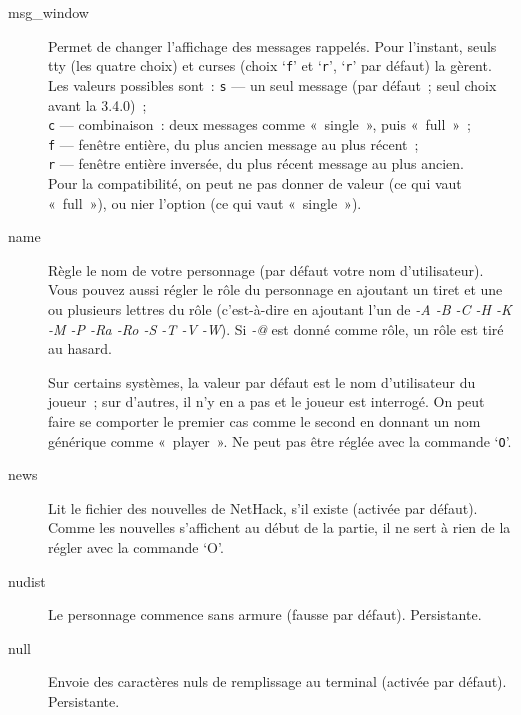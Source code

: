 \documentclass[titlepage]{article}
\begin{document}
\begin{description}
\item[{msg\_window}]
Permet de changer l'affichage des messages rappelés.
Pour l'instant, seuls tty (les quatre choix) et curses (choix
`\texttt{f}' et `\texttt{r}', `\texttt{r}' par défaut) la
gèrent.
Les valeurs possibles sont~:
\texttt{s} --- un seul message (par défaut~; seul choix avant la 3.4.0)~;\\
\texttt{c} --- combinaison~: deux messages comme «~single~», puis «~full~»~;\\
\texttt{f} --- fenêtre entière, du plus ancien message au plus récent~;\\
\texttt{r} --- fenêtre entière inversée, du plus récent message au plus ancien.\\
Pour la compatibilité, on peut ne pas donner de valeur (ce qui vaut
«~full~»), ou nier l'option (ce qui vaut «~single~»).

\item[{name}]
Règle le nom de votre personnage (par défaut votre nom d'utilisateur).
Vous pouvez aussi régler le rôle du personnage en ajoutant un tiret et une
ou plusieurs lettres du rôle (c'est-à-dire en ajoutant l'un de
\textit{-A -B -C -H -K -M -P -Ra -Ro -S -T -V -W}).
Si
\textit{-@}
est donné comme rôle, un rôle est tiré au hasard.


Sur certains systèmes, la valeur par défaut est le nom d'utilisateur du
joueur~; sur d'autres, il n'y en a pas et le joueur est interrogé.
On peut faire se comporter le premier cas comme le second en donnant un nom
générique comme «~player~».
Ne peut pas être réglée avec la commande `\texttt{O}'.

\item[{news}]
Lit le fichier des nouvelles de NetHack, s'il existe (activée par
défaut).
Comme les nouvelles s'affichent au début de la partie, il ne sert à rien de
la régler avec la commande `O'.

\item[{nudist}]
Le personnage commence sans armure (fausse par défaut).
Persistante.

\item[{null}]
Envoie des caractères nuls de remplissage au terminal (activée par
défaut).
Persistante.


\end{description}
\end{document}
